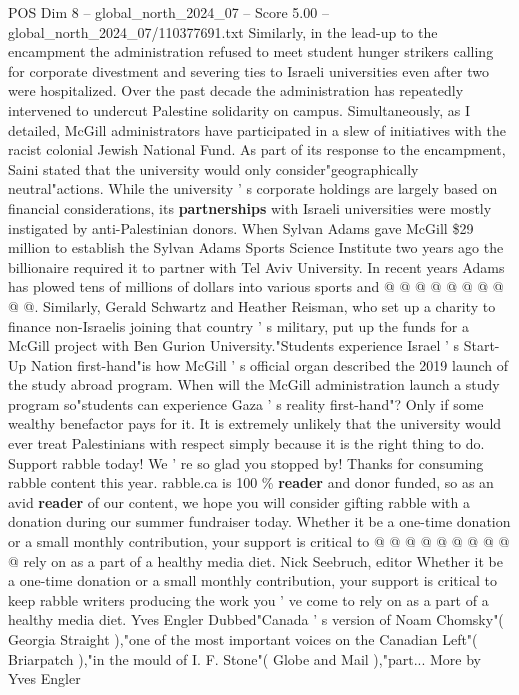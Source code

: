\begin{textsample}{POS Dim 8 – global\_north\_2024\_07 – Score 5.00 – global\_north\_2024\_07/110377691.txt}
Similarly, in the lead-up to the encampment the administration refused to meet student hunger strikers calling for corporate divestment and severing ties to Israeli universities even after two were hospitalized.
Over the past decade the administration has repeatedly intervened to undercut Palestine solidarity on campus.
Simultaneously, as I detailed, McGill administrators have participated in a slew of initiatives with the racist colonial Jewish National Fund.
As part of its response to the encampment, Saini stated that the university would only consider"geographically neutral"actions.
While the university ' s corporate holdings are largely based on financial considerations, its \textbf{partnerships} with Israeli universities were mostly instigated by anti-Palestinian donors.
When Sylvan Adams gave McGill \$29 million to establish the Sylvan Adams Sports Science Institute two years ago the billionaire required it to partner with Tel Aviv University.
In recent years Adams has plowed tens of millions of dollars into various sports and @ @ @ @ @ @ @ @ @ @.
Similarly, Gerald Schwartz and Heather Reisman, who set up a charity to finance non-Israelis joining that country ' s military, put up the funds for a McGill project with Ben Gurion University."Students experience Israel ' s Start-Up Nation first-hand"is how McGill ' s official organ described the 2019 launch of the study abroad program.
When will the McGill administration launch a study program so"students can experience Gaza ' s reality first-hand"?
Only if some wealthy benefactor pays for it.
It is extremely unlikely that the university would ever treat Palestinians with respect simply because it is the right thing to do.
Support rabble today!
We ' re so glad you stopped by!
Thanks for consuming rabble content this year. rabble.ca is 100 \% \textbf{reader} and donor funded, so as an avid \textbf{reader} of our content, we hope you will consider gifting rabble with a donation during our summer fundraiser today.
Whether it be a one-time donation or a small monthly contribution, your support is critical to @ @ @ @ @ @ @ @ @ @ rely on as a part of a healthy media diet.
Nick Seebruch, editor Whether it be a one-time donation or a small monthly contribution, your support is critical to keep rabble writers producing the work you ' ve come to rely on as a part of a healthy media diet.
Yves Engler Dubbed"Canada ' s version of Noam Chomsky"( Georgia Straight ),"one of the most important voices on the Canadian Left"( Briarpatch ),"in the mould of I.
F.
Stone"( Globe and Mail ),"part...
More by Yves Engler

\end{textsample}
